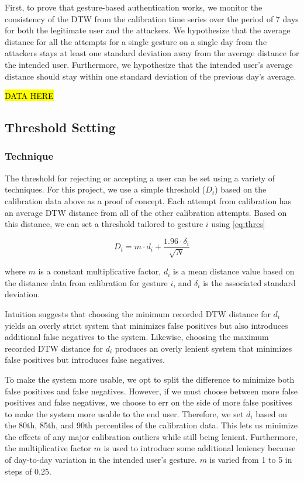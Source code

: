 First, to prove that gesture-based authentication works, we monitor the consistency of the \gls{DTW} from the calibration time series over the period of 7 days for both the legitimate user and the attackers. We hypothesize that the average distance for all the attempts for a single gesture on a single day from the attackers stays at least one standard deviation away from the average distance for the intended user. Furthermore, we hypothesize that the intended user's average distance should stay within one standard deviation of the previous day's average.

\hl{DATA HERE}

\subsection{Threshold Setting}

\subsubsection{Technique}

The threshold for rejecting or accepting a user can be set using a variety of techniques. For this project, we use a simple threshold ($D_{t}$) based on the calibration data above as a proof of concept. Each attempt from calibration has an average \gls{DTW} distance from all of the other calibration attempts. Based on this distance, we can set a threshold tailored to gesture $i$ using \autoref{eq:thres}

\begin{equation}
D_{t} = m \cdot d_{i} + \frac{1.96 \cdot \delta_{i}}  {\sqrt{N}}
\label{eq:thres}
\end{equation}

\noindent where $m$ is a constant multiplicative factor, $d_{i}$ is a mean distance value based on the distance data from calibration for gesture $i$, and $\delta_{i}$ is the associated standard deviation.

Intuition suggests that choosing the minimum recorded \gls{DTW} distance for $d_{i}$ yields an overly strict system that minimizes false positives but also introduces additional false negatives to the system. Likewise, choosing the maximum recorded \gls{DTW} distance for $d_{i}$ produces an overly lenient system that minimizes false positives but introduces false negatives. 

To make the system more usable, we opt to split the difference to minimize both false positives and false negatives. However, if we must choose between more false positives and false negatives, we choose to err on the side of more false positives to make the system more usable to the end user. Therefore, we set $d_{i}$ based on the 80th, 85th, and 90th percentiles of the calibration data. This lets us minimize the effects of any major calibration outliers while still being lenient. Furthermore, the multiplicative factor $m$ is used to introduce some additional leniency because of day-to-day variation in the intended user's gesture. $m$ is varied from 1 to 5 in steps of 0.25.

